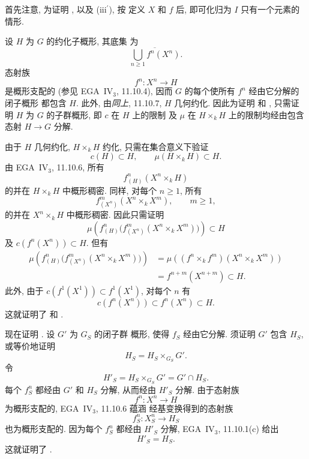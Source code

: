 首先注意, 为证明 \textup{}, \textup{} 以及
\textup{(iii\(^{\prime}\))}, 按 \textup{} 定义 \(X\) 和 \(f\) 后,
即可化归为 \(I\) 只有一个元素的情形.

设 \(H\) 为 \(G\) 的约化子概形, 其底集
为
\[
  \overline{\bigcup_{n\geq1}f^n(X^n)}.
\]
态射族
\[
  f^n:X^n\longrightarrow H
\]
是概形支配的 (参见 EGA~IV\(_3\), 11.10.4), 因而
\(G\) 的每个使所有 \(f^n\) 经由它分解的闭子概形
都包含 \(H\). 此外, 由\emph{同上},
11.10.7, \(H\) 几何约化. 因此为证明
\textup{} 和 \textup{}, 只需证明
\(H\) 为 \(G\) 的子群概形, 即 \(c\) 在 \(H\) 上的限制
及 \(\mu\) 在
\(H\times_kH\) 上的限制均经由包含态射 \(H\to G\) 分解.

由于 \(H\) 几何约化, \(H\times_kH\) 约化,
只需在集合意义下验证
\[
  c(H)\subset H,
  \qquad
  \mu(H\times_kH)\subset H.
\]
由 EGA~IV\(_3\), 11.10.6, 所有
\[
  f^n_{(H)}(X^n\times_kH)
\]
的并在 \(H\times_kH\) 中概形稠密. 同样, 对每个
\(n\geq1\), 所有
\[
  f^m_{(X^n)}(X^n\times_kX^m),
  \qquad m\geq1,
\]
的并在 \(X^n\times_kH\) 中概形稠密.
因此只需证明
\[
  \mu\!\left(
    f^n_{(H)}
      \bigl(f^m_{(X^n)}(X^n\times_kX^m)\bigr)
  \right)\subset H
\]
及 \(c(f^n(X^n))\subset H\). 但有
\[
\begin{aligned}
  \mu\!\left(
    f^n_{(H)}
      \bigl(f^m_{(X^n)}(X^n\times_kX^m)\bigr)
  \right)
  &=
  \mu\!\left((f^n\times_k f^m)(X^n\times_kX^m)\right)\\
  &=f^{n+m}(X^{n+m})\subset H.
\end{aligned}
\]
此外, 由于 \(c(f^1(X^1))\subset f^1(X^1)\), 对每个 \(n\)
有
\[
  c(f^n(X^n))\subset f^n(X^n)\subset H.
\]
这就证明了 \textup{} 和 \textup{}.

现在证明 \textup{}. 设 \(G'\) 为 \(G_S\) 的闭子群
概形, 使得 \(f_S\) 经由它分解. 须证明
\(G'\) 包含 \(H_S\), 或等价地证明
\[
  H_S=H_S\times_{G_S}G'.
\]
令
\[
  H'_S=H_S\times_{G_S}G'=G'\cap H_S.
\]
每个 \(f^n_S\) 都经由 \(G'\) 和 \(H_S\) 分解,
从而经由 \(H'_S\) 分解. 由于态射族
\[
  f^n:X^n\longrightarrow H
\]
为概形支配的, EGA~IV\(_3\), 11.10.6 蕴涵
经基变换得到的态射族
\[
  f^n_S:X^n_S\longrightarrow H_S
\]
也为概形支配的. 因为每个 \(f^n_S\)
都经由 \(H'_S\) 分解, EGA~IV\(_3\), 11.10.1\textup{(c)}
给出
\[
  H'_S=H_S.
\]
这就证明了 \textup{}.

